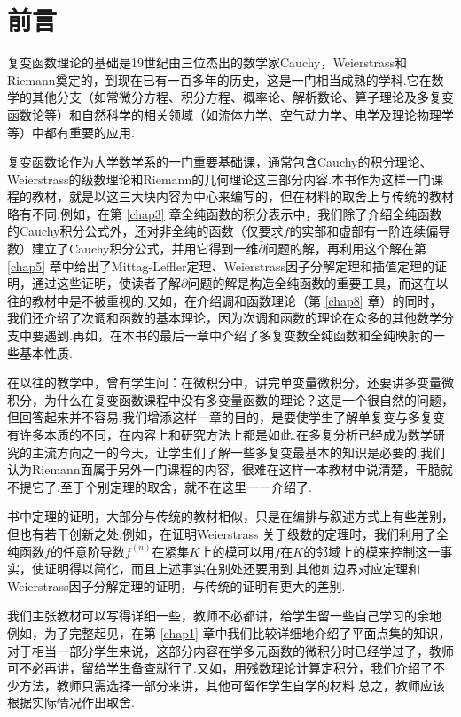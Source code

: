 

\chapter*{前\qquad 言}


复变函数理论的基础是19世纪由三位杰出的数学家Cauchy，Weierstrass和Riemann奠定的，到现在已有一百多年的历史，这是一门相当成熟的学科.它在数学的其他分支（如常微分方程、积分方程、概率论、解析数论、算子理论及多复变函数论等）和自然科学的相关领域（如流体力学、空气动力学、电学及理论物理学等）中都有重要的应用.

复变函数论作为大学数学系的一门重要基础课，通常包含Cauchy的积分理论、Weierstrass的级数理论和Riemann的几何理论这三部分内容.本书作为这样一门课程的教材，就是以这三大块内容为中心来编写的，但在材料的取舍上与传统的教材略有不同.例如，在第 \ref{chap3} 章全纯函数的积分表示中，我们除了介绍全纯函数的Cauchy积分公式外，还对非全纯的函数（仅要求$f$的实部和虚部有一阶连续偏导数）建立了Cauchy积分公式，并用它得到一维$\bar\partial$问题的解，再利用这个解在第 \ref{chap5} 章中给出了Mittag-Leffler定理、Weierstrass因子分解定理和插值定理的证明，通过这些证明，使读者了解$\bar\partial$问题的解是构造全纯函数的重要工具，而这在以往的教材中是不被重视的.又如，在介绍调和函数理论（第 \ref{chap8} 章）的同时，我们还介绍了次调和函数的基本理论，因为次调和函数的理论在众多的其他数学分支中要遇到.再如，在本书的最后一章中介绍了多复变数全纯函数和全纯映射的一些基本性质.

在以往的教学中，曾有学生问：在微积分中，讲完单变量微积分，还要讲多变量微积分，为什么在复变函数课程中没有多变量函数的理论？这是一个很自然的问题，但回答起来并不容易.我们增添这样一章的目的，是要使学生了解单复变与多复变有许多本质的不同，在内容上和研究方法上都是如此.在多复分析已经成为数学研究的主流方向之一的今天，让学生们了解一些多复变最基本的知识是必要的.我们认为Riemann面属于另外一门课程的内容，很难在这样一本教材中说清楚，干脆就不提它了.至于个别定理的取舍，就不在这里一一介绍了.

书中定理的证明，大部分与传统的教材相似，只是在编排与叙述方式上有些差别，但也有若干创新之处.例如，在证明Weierstrass 关于级数的定理时，我们利用了全纯函数$f$的任意阶导数$f^{(n)}$在紧集$K$上的模可以用$f$在$K$的邻域上的模来控制这一事实，使证明得以简化，而且上述事实在别处还要用到.其他如边界对应定理和Weierstrass因子分解定理的证明，与传统的证明有更大的差别.

我们主张教材可以写得详细一些，教师不必都讲，给学生留一些自己学习的余地.例如，为了完整起见，在第 \ref{chap1} 章中我们比较详细地介绍了平面点集的知识，对于相当一部分学生来说，这部分内容在学多元函数的微积分时已经学过了，教师可不必再讲，留给学生备查就行了.又如，用残数理论计算定积分，我们介绍了不少方法，教师只需选择一部分来讲，其他可留作学生自学的材料.总之，教师应该根据实际情况作出取舍.

